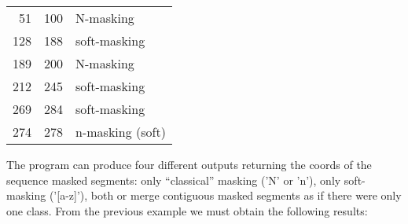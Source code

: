 \documentclass[11pt]{article}
\begin{document}
\begin{center}
\renewcommand{\arraystretch}{0.85}
\begin{tabular}{rrl}
  51 & 100 & N-masking \\
 128 & 188 & soft-masking \\
 189 & 200 & N-masking \\
 212 & 245 & soft-masking \\
 269 & 284 & soft-masking \\
 274 & 278 & n-masking (soft) \\
\end{tabular}
\end{center}



The program can produce four different outputs returning the coords of the sequence masked segments: only ``classical'' masking ('N' or 'n'), only soft-masking ('[a-z]'), both or merge contiguous masked segments as if there were only one class. From the previous example we must obtain the following results:
\end{document}
